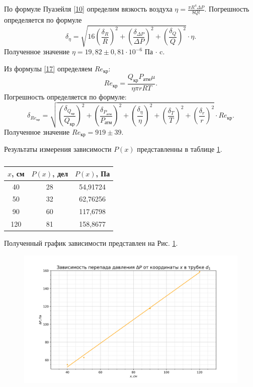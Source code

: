 \documentclass[a4paper, 12pt]{article}
\begin{document}
\newpage
\par По формуле Пуазейля \eqref{10} определим вязкость воздуха $\eta = \frac{\pi R^4\Delta{P}}{8Ql}$. Погрешность определяется по формуле
\begin{equation}\label{19}
\delta_{\eta} = \sqrt{16\left(\frac{\delta_{R}}{R}\right)^2 + \left(\frac{\delta_{\Delta{P}}}{\Delta{P}}\right)^2 + \left(\frac{\delta_{Q}}{Q}\right)^2} \cdot \eta.
\end{equation}
Полученное значение $\eta = 19,82\pm0,81\cdot10^{-6}$ Па $\cdot$ c.
\par Из формулы \eqref{17} определяем $Re_{\text{кр}}$:
\begin{equation}\label{20}
Re_{\text{кр}} = \frac{Q_{\text{кр}}P_{\text{атм}}\mu}{\eta\pi rRT}.
\end{equation}
Погрешность определяется по формуле:
\begin{equation}\label{21}
\delta_{Re_{\text{кр}}} = \sqrt{\left(\frac{\delta_{Q_{\text{кр}}}}{Q_{\text{кр}}}\right)^2 + \left(\frac{\delta_{P_{\text{атм}}}}{P_{\text{атм}}}\right)^2 + \left(\frac{\delta_{\eta}}{\eta}\right)^2 + \left(\frac{\delta_{T}}{T}\right)^2 + \left(\frac{\delta_{r}}{r}\right)^2} \cdot Re_{\text{кр}}.
\end{equation}
Полученное значение $Re_{\text{кр}} = 919\pm39$.
\par Результаты измерения зависимости $P(x)$ представленны в таблице \ref{tab3}.
\begin{table}[h!]
\begin{center}
\begin{tabular}{|c|c|c|}
\hline
$x$, см & $P(x)$, дел & $P(x)$, Па \\ \hline
40    & 28        & 54,91724 \\ \hline
50    & 32        & 62,76256 \\ \hline
90    & 60        & 117,6798 \\ \hline
120   & 81        & 158,8677 \\ \hline
\end{tabular}
\caption{}
\label{tab3}
\end{center}
\end{table}
Полученный график зависимости представлен на Рис. \ref{ris7}.
\begin{figure}[h!]
\begin{flushleft}
    \includegraphics[scale=0.75]{1.3.3_3.png}
\end{flushleft}
\caption{}
\label{ris7}
\end{figure}
\end{document}

